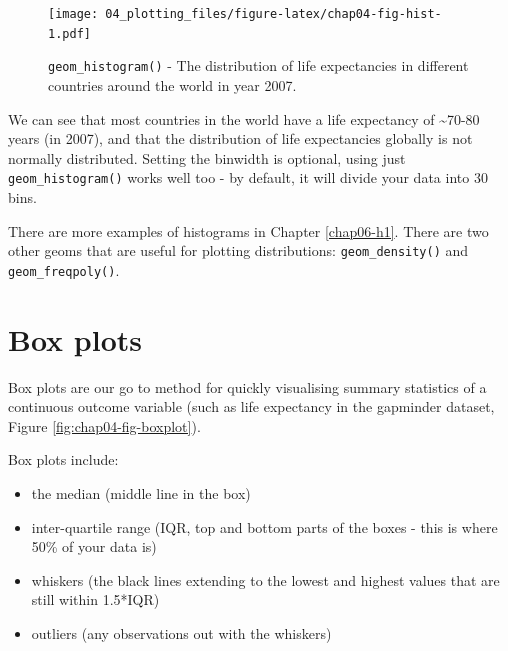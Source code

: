 \documentclass[
  12pt,
  krantz2]{krantz}
\makeatletter
\newenvironment{Shaded}{\begin{snugshade}}{\end{snugshade}}
\newcommand{\DataTypeTok}[1]{\textcolor[rgb]{0.13,0.29,0.53}{#1}}
\newcommand{\KeywordTok}[1]{\textcolor[rgb]{0.13,0.29,0.53}{\textbf{#1}}}
\newcommand{\NormalTok}[1]{#1}
\newcommand{\OperatorTok}[1]{\textcolor[rgb]{0.81,0.36,0.00}{\textbf{#1}}}
\newcommand{\StringTok}[1]{\textcolor[rgb]{0.31,0.60,0.02}{#1}}
\providecommand{\tightlist}{%
  \setlength{\itemsep}{0pt}\setlength{\parskip}{0pt}}
\newenvironment{kframe}{%
\medskip{}
\setlength{\fboxsep}{.8em}
 \def\at@end@of@kframe{}%
 \ifinner\ifhmode%
  \def\at@end@of@kframe{\end{minipage}}%
  \begin{minipage}{\columnwidth}%
 \fi\fi%
 \def\FrameCommand##1{\hskip\@totalleftmargin \hskip-\fboxsep
 \colorbox{shadecolor}{##1}\hskip-\fboxsep
     \hskip-\linewidth \hskip-\@totalleftmargin \hskip\columnwidth}%
 \MakeFramed {\advance\hsize-\width
   \@totalleftmargin\z@ \linewidth\hsize
   \@setminipage}}%
 {\par\unskip\endMakeFramed%
 \at@end@of@kframe}
\renewenvironment{Shaded}{\begin{kframe}}{\end{kframe}}
\makeatother
\begin{document}
\begin{figure}
\centering
\texttt{[image: 04\_plotting\_files/figure-latex/chap04-fig-hist-1.pdf]}
\caption{\label{fig:chap04-fig-hist}\texttt{geom\_histogram()} - The distribution of life expectancies in different countries around the world in year 2007.}
\end{figure}

We can see that most countries in the world have a life expectancy of \textasciitilde70-80 years (in 2007), and that the distribution of life expectancies globally is not normally distributed.
Setting the binwidth is optional, using just \texttt{geom\_histogram()} works well too - by default, it will divide your data into 30 bins.

There are more examples of histograms in Chapter \ref{chap06-h1}. There are two other geoms that are useful for plotting distributions: \texttt{geom\_density()} and \texttt{geom\_freqpoly()}.

\hypertarget{box-plots}{%
\section{Box plots}\label{box-plots}}


Box plots are our go to method for quickly visualising summary statistics of a continuous outcome variable (such as life expectancy in the gapminder dataset, Figure \ref{fig:chap04-fig-boxplot}).

Box plots include:

\begin{itemize}
\tightlist
\item
  the median (middle line in the box)
\item
  inter-quartile range (IQR, top and bottom parts of the boxes - this is where 50\% of your data is)
\item
  whiskers (the black lines extending to the lowest and highest values that are still within 1.5*IQR)
\item
  outliers (any observations out with the whiskers)
\end{itemize}

\begin{Shaded}
\end{Shaded}
\end{document}
